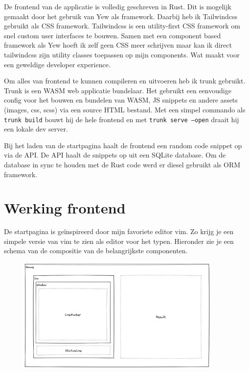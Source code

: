 De frontend van de applicatie is volledig geschreven in Rust. Dit is mogelijk gemaakt door het
gebruik van Yew als framework. Daarbij heb ik Tailwindcss gebruikt als CSS framework. Tailwindcss is
een utility-first CSS framework om snel custom user interfaces te bouwen. Samen met een component
based framework als Yew hoeft ik zelf geen CSS meer schrijven maar kan ik direct tailwindcss zijn
utility classes toepassen op mijn components. Wat maakt voor een geweldige developer experience. 

Om alles van frontend te kunnen compileren en uitvoeren heb ik trunk gebruikt. Trunk is een WASM web
applicatie bundelaar. Het gebruikt een eenvoudige config voor het bouwen en bundelen van WASM, JS
snippets en andere assets (images, css, scss) via een source HTML bestand. Met een simpel commando
als \texttt{trunk build} bouwt hij de hele frontend en met \texttt{trunk serve
--open} draait hij een lokale dev server.  

Bij het laden van de startpagina haalt de frontend een random code snippet op via de API. De API
haalt de snippets op uit een SQLite database. Om de database in sync te houden met de Rust code werd
er diesel gebruikt als ORM framework.


\clearpage

\section{Werking frontend}

De startpagina is geïnspireerd door mijn favoriete editor vim. Zo krijg je een simpele versie van
vim te zien als editor voor het typen. Hieronder zie je een schema van de compositie van de
belangrijkste componenten.

\begin{figure}[h]
  \centering
  \includegraphics[width=0.9\textwidth]{./figures/components.png}
\end{figure}

